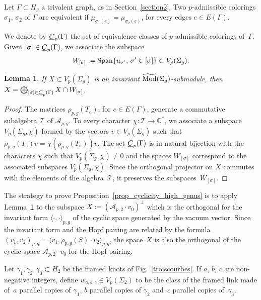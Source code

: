 \documentclass[11pt]{article}
\numberwithin{equation}{section}
\newtheorem{Lemma}[Theorem]{Lemma}
\begin{document}
Let $\Gamma\subset H_g$ a trivalent graph, as in Section~\ref{section2}. Two $p$-admissible colorings $\sigma_1$, $\sigma_2$ of $\Gamma$ are equivalent if $\mu_{\sigma_1(e)}=\mu_{\sigma_2(e)}$, for every edges $e \in E(\Gamma)$.

We denote by $\underline{C}_p(\Gamma)$ the set of equivalence classes of $p$-admissible colorings of~$\Gamma$. Given $[\sigma]\in \underline{C}_p(\Gamma)$, we associate the subspace
\begin{gather*} W_{[\sigma]} := \operatorname{Span} \{ u_{\sigma'},\, \sigma'\in [\sigma] \} \subset V_p(\Sigma_g). \end{gather*}

\begin{Lemma}\label{lemma1}If $X\subset V_p(\Sigma_g)$ is an invariant $\widetilde{\operatorname{Mod}}(\Sigma_g)$-submodule, then $ X=\bigoplus_{[\sigma]\in \underline{C}_p(\Gamma)} X\cap W_{[\sigma]}$.
\end{Lemma}

\begin{proof} The matrices $\rho_{p,g}(T_e)$, for $e\in E(\Gamma)$, generate a commutative subalgebra $\mathcal{T}$ of $\mathcal{A}_{p,g}$. To every character $\chi \colon \mathcal{T}\rightarrow \mathbb{C}^*$, we associate a subspace $V_p(\Sigma_g, \chi)$ formed by the vectors $v\in V_p(\Sigma_g)$ such that $\rho_{p,g}(T_e)v=\chi(\rho_{p,g}(T_e))v$. The set $\underline{C}_p(\Gamma)$ is in natural bijection with the characters $\chi$ such that $V_p(\Sigma_g,\chi)\neq 0$ and the spaces $W_{[\sigma]}$ correspond to the associated subspaces $V_p(\Sigma_g, \chi)$. Since the orthogonal projector on $X$ commutes with the elements of the algebra~$\mathcal{T}$, it preserves the subspaces~$W_{[\sigma]}$.
\end{proof}

The strategy to prove Proposition~\ref{prop_cyclicity_high_genus} is to apply Lemma~\ref{lemma1} to the subspace $ X:= ( \mathcal{A}_{p,2}\cdot v_0 ) ^{\bot}$ which is the orthogonal for the invariant form $\langle \cdot, \cdot \rangle_{p,g}$ of the cyclic space generated by the vacuum vector. Since the invariant form and the Hopf pairing are related by the formula $(v_1, v_2)_{p,g}=\langle v_1, \rho_{p,g}(S)\cdot v_2\rangle_{p,g}$, the space~$X$ is also the orthogonal of the cyclic space $\mathcal{A}_{p,2}\cdot v_0$ for the Hopf pairing.

Let $\gamma_1, \gamma_2, \gamma_3 \subset H_2$ be the framed knots of Fig.~\ref{troiscourbes}. If $a$, $b$, $c$ are non-negative integers, define $w_{a,b,c}\in V_p(\Sigma_2)$ to be the class of the framed link made of~$a$ parallel copies of $\gamma_1$, $b$ parallel copies of $\gamma_2$ and~$c$ parallel copies of~$\gamma_3$.
\end{document}
